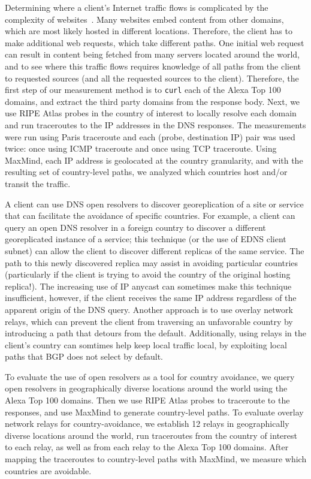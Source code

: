 Determining where a client's Internet traffic flows is complicated by
the complexity of websites~\cite{butkiewicz2011understanding}.  Many
websites embed content from other domains, which are most likely
hosted in different locations.  Therefore, the client has to make
additional web requests, which take different paths.  One initial web
request can result in content being fetched from many servers located
around the world, and to see where this traffic flows requires knowledge
of all paths from the client to requested sources (and all the requested
sources to the client).  Therefore, the first step of our measurement 
method is to {\tt curl} each of the Alexa Top 100 domains, and extract 
the third party domains from the response body.  Next, we use RIPE Atlas 
probes in the country of interest to locally resolve each domain and run 
traceroutes to the IP addresses in the DNS responses.  The measurements 
were run using Paris traceroute and each (probe, destination IP) pair 
was used twice: once using ICMP traceroute and once using TCP traceroute. 
Using MaxMind, each IP address is geolocated at the country granularity, 
and with the resulting set of country-level paths, we analyzed which 
countries host and/or transit the traffic.

A client can use DNS open resolvers to discover georeplication of a site
or service that can facilitate the avoidance of specific countries. For
example, a client can query an open DNS resolver in a foreign country to
discover a different georeplicated instance of a service; this technique
(or the use of EDNS client subnet) can allow the client to discover
different replicas of the same service. The path to this newly
discovered replica may assist in avoiding particular countries
(particularly if the client is trying to avoid the country of the
original hosting replica!).  The increasing use of IP anycast can
sometimes make this technique
insufficient, however, if the client
receives the same IP address regardless of the apparent origin of the
DNS query.  Another approach is to use overlay network relays, which can
prevent the client from traversing an unfavorable country by introducing
a path that detours from the default. Additionally, using
relays in the client's country can somtimes help keep local traffic
local, by exploiting local paths that BGP does not select by default.
  
To evaluate the use of open resolvers as a tool for country avoidance, we
query open resolvers in geographically diverse locations around the world 
using the Alexa Top 100 domains.  Then we use RIPE Atlas probes to traceroute 
to the responses, and use MaxMind to generate country-level paths.  To evaluate 
overlay network relays for country-avoidance, we establish 12 relays in geographically 
diverse locations around the world, run traceroutes from the country of interest to 
each relay, as well as from each relay to the Alexa Top 100 domains.  After mapping 
the traceroutes to country-level paths with MaxMind, we measure which countries are 
avoidable.

